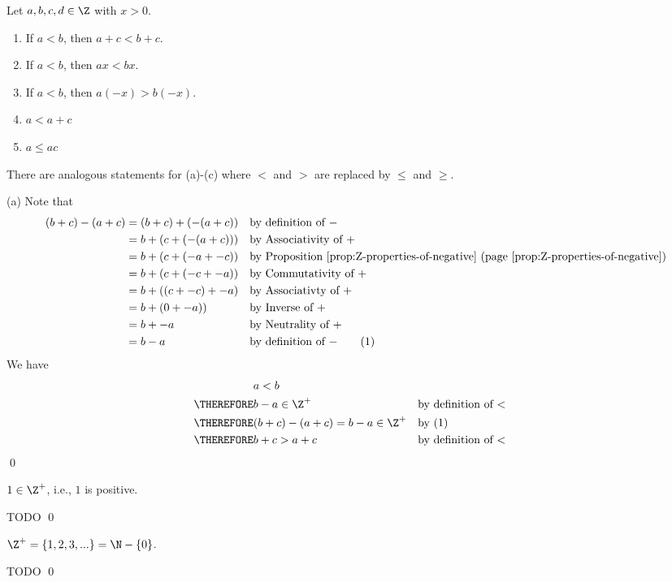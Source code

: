 \begin{prop}
Let $a, b, c, d \in \Z$ with $x > 0$.
\begin{enumerate}[nosep,label=\textnormal{(\alph*)}]
\item If $a < b$, then $a + c < b + c$. 
\item If $a < b$, then $ax < bx$.
\item If $a < b$, then $a(-x) > b(-x)$.
\item $a < a + c$
\item $a \leq ac$
\end{enumerate}
There are analogous statements for (a)-(c) where $<$ and $>$
are replaced by $\leq$ and $\geq$.
\end{prop}
\proof
(a)
Note that
\begin{align*}
(b + c) - (a + c)
&= (b + c) + (-(a + c)) & & \text{by definition of $-$}\\ 
&= b + (c + (-(a + c))) & & \text{by Associativity of $+$}\\
&= b + (c + (-a + -c))  & & \text{by Proposition \ref{prop:Z-properties-of-negative} (page \pageref{prop:Z-properties-of-negative})}\\
&= b + (c + (-c + -a))  & & \text{by Commutativity of $+$}\\
&= b + ((c + -c) + -a)  & & \text{by Associativty of $+$}\\
&= b + (0 + -a))        & & \text{by Inverse of $+$}\\
&= b + -a               & & \text{by Neutrality of $+$}\\
&= b - a                & & \text{by definition of $-$} \tag{1}
\end{align*}
We have
\begin{align*}
           & a < b \\
\THEREFORE & b - a \in \Z^+                     & & \text{by definition of $<$} \\
\THEREFORE & (b + c) - (a + c) = b - a \in \Z^+ & & \text{by (1)}\\
\THEREFORE & b + c > a + c                      & & \text{by definition of $<$}
\end{align*}
\qed

\begin{prop}
$1 \in \Z^+$, i.e., $1$ is positive.
\end{prop}
\proof
TODO
\qed

\begin{prop}
$\Z^+ = \{1, 2, 3, ...\} = \N - \{0\}$.
\end{prop}
\proof
TODO
\qed

